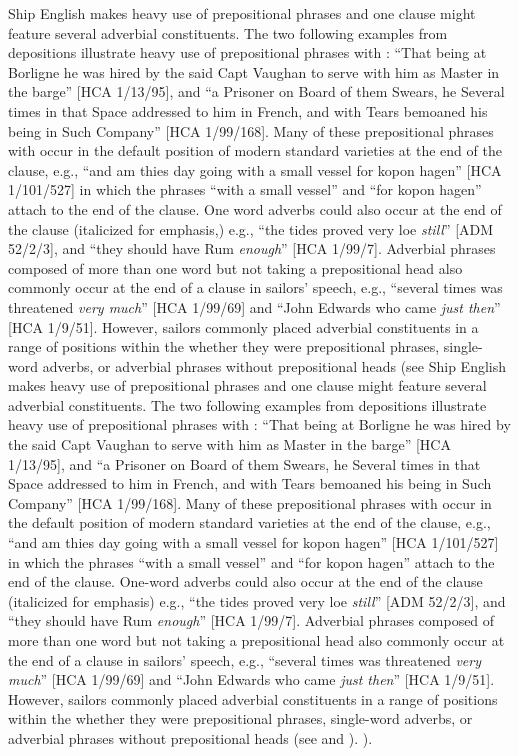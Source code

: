 {\color{red}
Ship English makes heavy use of prepositional phrases and one clause might feature several adverbial constituents. The two following examples from depositions illustrate heavy use of prepositional phrases with : “That being at Borligne he was hired by the said Capt Vaughan to serve with him as Master in the barge” [HCA 1/13/95], and “a Prisoner on Board of them Swears, he Several times in that Space addressed to him in French, and with Tears bemoaned his being in Such Company” [HCA 1/99/168]. Many of these prepositional phrases with  occur in the default position of modern standard varieties at the end of the clause, e.g., “and am thies day going with a small vessel for kopon hagen” [HCA 1/101/527] in which the phrases “with a small vessel” and “for kopon hagen” attach to the end of the clause. One word adverbs could also occur at the end of the clause (italicized for emphasis,) e.g., “the tides proved very loe \textit{still}” [ADM 52/2/3], and “they should have Rum \textit{enough}” [HCA 1/99/7]. Adverbial phrases composed of more than one word but not taking a prepositional head also commonly occur at the end of a clause in sailors’ speech, e.g., “several times was threatened \textit{very much}” [HCA 1/99/69] and “John Edwards who came \textit{just then}” [HCA 1/9/51]. However, sailors commonly placed adverbial constituents in a range of positions within the  whether they were prepositional phrases, single-word adverbs, or adverbial phrases without prepositional heads (see
Ship English makes heavy use of prepositional phrases and one clause might feature several adverbial constituents. The two following examples from depositions illustrate heavy use of prepositional phrases with : “That being at Borligne he was hired by the said Capt Vaughan to serve with him as Master in the barge” [HCA 1/13/95], and “a Prisoner on Board of them Swears, he Several times in that Space addressed to him in French, and with Tears bemoaned his being in Such Company” [HCA 1/99/168]. Many of these prepositional phrases with  occur in the default position of modern standard varieties at the end of the clause, e.g., “and am thies day going with a small vessel for kopon hagen” [HCA 1/101/527] in which the phrases “with a small vessel” and “for kopon hagen” attach to the end of the clause. One-word adverbs could also occur at the end of the clause (italicized for emphasis) e.g., “the tides proved very loe \textit{still}” [ADM 52/2/3], and “they should have Rum \textit{enough}” [HCA 1/99/7]. Adverbial phrases composed of more than one word but not taking a prepositional head also commonly occur at the end of a clause in sailors’ speech, e.g., “several times was threatened \textit{very much}” [HCA 1/99/69] and “John Edwards who came \textit{just then}” [HCA 1/9/51]. However, sailors commonly placed adverbial constituents in a range of positions within the  whether they were prepositional phrases, single-word adverbs, or adverbial phrases without prepositional heads (see  and ). 
). 
}

